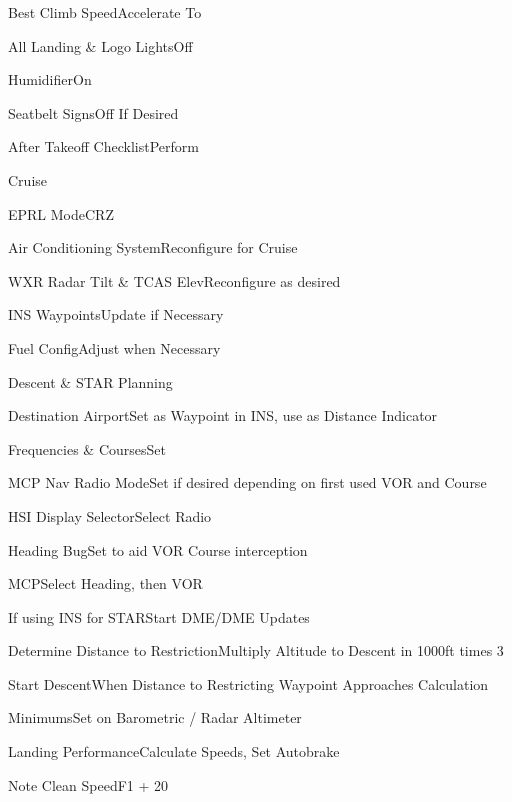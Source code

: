 \documentclass[sim-use, blue_items]{checklist}
\begin{document}
\begin{continuedchecklist}
	 {
		\item{Best Climb Speed}{Accelerate To}
		\item{All Landing \& Logo Lights}{Off}
		\item{Humidifier}{On}
		\item{Seatbelt Signs}{Off If Desired}
		\item{After Takeoff Checklist}{Perform}
	}
\end{continuedchecklist}

\begin{checklist}{Cruise}
	 {
		\item{EPRL Mode}{CRZ}
		\item{Air Conditioning System}{Reconfigure for Cruise}
	\item{WXR Radar Tilt \& TCAS Elev}{Reconfigure as desired}
	}
	\item{INS Waypoints}{Update if Necessary}
	\item{Fuel Config}{Adjust when Necessary}
\end{checklist}

\begin{checklist}{Descent \& STAR Planning}
	\item{Destination Airport}{Set as Waypoint in INS, use as Distance Indicator}
	 {
		\item{Frequencies \& Courses}{Set}
		\item{MCP Nav Radio Mode}{Set if desired depending on first used VOR and Course}
		\item{HSI Display Selector}{Select Radio}
		\item{Heading Bug}{Set to aid VOR Course interception}
		\item{MCP}{Select Heading, then VOR}
	}
	\item{If using INS for STAR}{Start DME/DME Updates}
	 {
		\item{Determine Distance to Restriction}{Multiply Altitude to Descent in 1000ft times 3}
		\item{Start Descent}{When Distance to Restricting Waypoint Approaches Calculation}
	}
	\item{Minimums}{Set on Barometric / Radar Altimeter}
	\item{Landing Performance}{Calculate Speeds, Set Autobrake}
	\item{Note Clean Speed}{F1 + 20}
\end{checklist}
\end{document}

